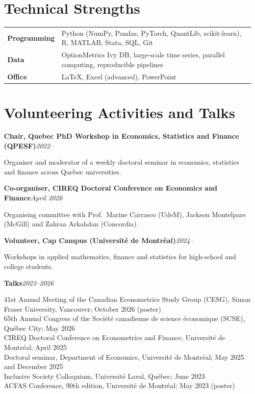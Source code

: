 \documentclass[11pt,letterpaper]{article}
\newenvironment{block}{\begin{list}{}{\setlength{\leftmargin}{1.6em}\setlength{\topsep}{0pt}%
  \setlength{\partopsep}{0pt}\setlength{\itemsep}{0pt}\setlength{\parsep}{0pt}}\item[]}{\end{list}}
\newcommand{\entry}[2]{\textbf{#1}\hfill\textit{#2}\par}
\newcommand{\gap}{\par\vspace{0.6em}}
\begin{document}
\section*{Technical Strengths}
\begin{block}
\begin{tabularx}{\linewidth}{@{}l X@{}}
\textbf{Programming} & Python (NumPy, Pandas, PyTorch, QuantLib, scikit-learn), R, MATLAB, Stata, SQL, Git \\
\textbf{Data}        & OptionMetrics Ivy DB, large-scale time series, parallel computing, reproducible pipelines \\
\textbf{Office}      & \LaTeX, Excel (advanced), PowerPoint \\
\end{tabularx}
\end{block}

\section*{Volunteering Activities and Talks}
\begin{block}
\entry{Chair, Quebec PhD Workshop in Economics, Statistics and Finance (QPESF)}{2022--}
Organiser and moderator of a weekly doctoral seminar in economics, statistics and finance across Quebec
universities.
\gap
\entry{Co-organiser, CIREQ Doctoral Conference on Economics and Finance}{April 2026}
Organising committee with Prof.\ Marine Carrasco (UdeM), Jackson Montelpare (McGill) and Zahraa Arkahdan
(Concordia).
\gap
\entry{Volunteer, Cap Campus (Université de Montréal)}{2024--}
Workshops in applied mathematics, finance and statistics for high-school and college students.
\gap
\entry{Talks}{2023--2026}
41st Annual Meeting of the Canadian Econometrics Study Group (CESG), Simon Fraser University,
Vancouver; October 2026 (poster)\\
65th Annual Congress of the Société canadienne de science économique (SCSE), Québec City; May 2026\\
CIREQ Doctoral Conference on Econometrics and Finance, Université de Montréal; April 2025\\
Doctoral seminar, Department of Economics, Université de Montréal; May 2025 and December 2025\\
Inclusive Society Colloquium, Université Laval, Québec; June 2023\\
ACFAS Conference, 90th edition, Université de Montréal; May 2023 (poster)
\end{block}
\end{document}
